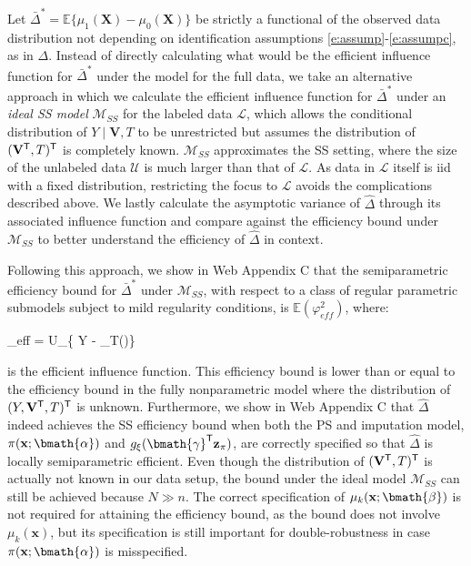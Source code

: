 \documentclass[useAMS,referee,usenatbib]{biom}
\def\bx{\mathbf{x}}
\def\bX{\mathbf{X}}
\def\bz{\mathbf{z}}
\def\bV{\mathbf{V}}
\def\bgam{\bmath{\gamma}}
\def\balph{\bmath{\alpha}}
\def\bbeta{\bmath{\beta}}
\def\Delthat{\widehat{\Delta}}
\def\Deltabarstr{\bar{\Delta}^*}
\def\Lscr{\mathscr{L}}
\def\Uscr{\mathscr{U}}
\def\Mscr{\mathcal{M}}
\def\trans{^{\sf \tiny T}}
\def\bzpi{\bz_{\pi}}
\def\E{\mathbb{E}}
\def\bzpi{\bz_{\pi}}
\newenvironment{eq} 
{
\align
}
{
\endalign
}
\begin{document}
Let $\Deltabarstr= \E\{ \mu_1(\bX)-\mu_0(\bX)\}$ be strictly a functional of the observed data distribution not depending on identification assumptions \eqref{e:assump}-\eqref{e:assumpc}, as in $\Delta$.
Instead of directly calculating what would be the efficient influence function for $\Deltabarstr$ under the model for the 
full data, we take an alternative approach in which we calculate the efficient influence function for $\Deltabarstr$ under 
an \emph{ideal SS model} $\Mscr_{SS}$ for the labeled data $\Lscr$, which allows the conditional distribution of $Y\mid \bV,T$ 
to be unrestricted but assumes the distribution of $(\bV\trans,T)\trans$ is 
completely known. $\Mscr_{SS}$ approximates the SS setting, where the size of the unlabeled data $\Uscr$  
is much larger than that of $\Lscr$. As data in $\Lscr$ itself is iid with a fixed distribution, restricting the focus to $\Lscr$ avoids the
complications described above. We lastly calculate the asymptotic variance of $\Delthat$ through its 
associated influence function and compare against the efficiency bound under $\Mscr_{SS}$ to better understand the efficiency
of $\Delthat$ in context.

Following this approach, we show in Web Appendix C that the semiparametric efficiency bound for $\Deltabarstr$ under
$\Mscr_{SS}$, with respect to a class of regular parametric submodels subject to mild regularity conditions, is $\E(\varphi_{eff}^2)$, where:
\begin{eq}
    \varphi_{eff} = U_{\pi}\{ Y - \xi_T(\bV)\}
\end{eq}
is the efficient influence function.  This efficiency bound is lower than or equal to the efficiency bound in the fully 
nonparametric model where the distribution of $(Y,\bV\trans,T)\trans$ is unknown.  Furthermore, 
we show in Web Appendix C
that $\Delthat$ indeed achieves the SS efficiency bound when both the PS and imputation model, $\pi(\bx;\balph)$ and 
$g_{\xi}(\bgam\trans\bzpi)$, are correctly specified so that $\Delthat$ is locally semiparametric efficient.  Even though 
the distribution of $(\bV\trans,T)\trans$ is actually not known in our data setup, the bound under the ideal model $\Mscr_{SS}$ 
can still be achieved because $N \gg n$.  The correct specification of $\mu_k(\bx;\bbeta)$ is not required for attaining the efficiency bound, as the bound does not involve $\mu_k(\bx)$, but its specification is still important for double-robustness in case $\pi(\bx;\balph)$ is misspecified.  
\end{document}

